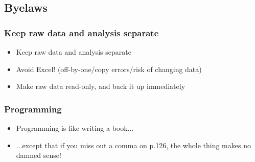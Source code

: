 %

\subsection{Byelaws}
\begin{frame}
  \frametitle{Keep raw data and analysis separate}
  \begin{itemize}
    \item Keep raw data and analysis separate
    \item Avoid Excel! (off-by-one/copy errors/risk of changing data)
    \item Make raw data read-only, and back it up immediately
  \end{itemize}
\end{frame}

\begin{frame}
  \frametitle{Programming}
  \begin{itemize}
    \item Programming is like writing a book$\ldots$
    \item $\ldots$except that if you miss out a comma on p.126, the whole thing makes no damned sense!
  \end{itemize}
\end{frame}
